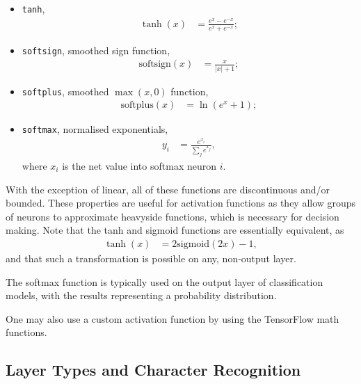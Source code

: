 \begin{itemize}
    \item\texttt{tanh},
        \begin{align*}
            \tanh(x) &= \frac{e^x - e^{-x}}{e^x + e^{-x}};
        \end{align*}

    \item\texttt{softsign}, smoothed sign function,
        \begin{align*}
            \text{softsign}(x) &= \frac{x}{|x| + 1};
        \end{align*}

    \item\texttt{softplus}, smoothed $\max(x,0)$ function,
        \begin{align*}
            \text{softplus}(x) &= \ln(e^x+1);
        \end{align*}

    \item\texttt{softmax}, normalised exponentials,
        \begin{align*}
            y_i &= \frac{e^{x_i}}{\sum_j e^{x_j}},
        \end{align*}
        where $x_i$ is the net value into softmax neuron $i$.
\end{itemize}
With the exception of linear, all of these functions are discontinuous and/or
bounded.
These properties are useful for activation functions as they allow groups of
neurons to approximate heavyside functions, which is necessary for decision
making.
Note that the tanh and sigmoid functions are essentially equivalent, as
\begin{align*}
    \tanh(x) &= 2\text{sigmoid}(2x) - 1,
\end{align*}
and that such a transformation is possible on any, non-output layer.

The softmax function is typically used on the output layer of classification
models, with the results representing a probability distribution.

One may also use a custom activation function by using the TensorFlow math
functions.



\subsection{Layer Types and Character Recognition}

